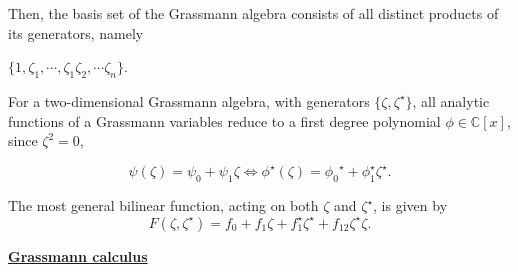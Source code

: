 \documentclass{homework}
\begin{document}
Then, the basis set of the Grassmann algebra consists of all distinct products of its generators, namely 

$\{1, \zeta_1, \cdots, \zeta_1 \zeta_2, \cdots \zeta_n\}$. 

For a two-dimensional Grassmann algebra, with generators $\{\zeta, {\zeta}^\star\}$, all analytic functions of a Grassmann variables reduce to a first degree polynomial $\phi \in \mathds{C}[x]$, since ${\zeta}^2 = 0$,

$$
    \psi(\zeta) = \psi_0 + \psi_1 \zeta \Leftrightarrow {\phi}^\star(\zeta) = {\phi_0}^\star + {\phi}^\star_1 {\zeta}^\star.
$$

The most general bilinear function, acting on both ${\zeta}$ and ${\zeta}^\star$, is given by 
$$
    F(\zeta, {\zeta}^\star) = f_0 + f_1 \zeta + {f}_1^\star {\zeta}^\star + f_{12} {\zeta}^\star \zeta.
$$

\textbf{\underline{Grassmann calculus}}
\end{document}
